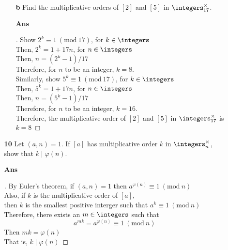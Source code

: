 \documentclass[paper=usletter, fontsize=12pt]{article}
\newcommand{\Mod}[1]{\ (\mathrm{mod}\ #1)}
\begin{document}
\begin{itemize}
\begin{itemize}
\begin{itemize}
                \item[\textbf{b}] Find the multiplicative orders of $[2]$ and
                $[5]$ in $\integers_{17}^\times$.
                \item[\textbf{Ans}]
                \begin{proof}[\unskip\nopunct]

                    Show $2^k \equiv 1 \Mod{17}$, for $k \in \integers$\\
                    Then, $2^k = 1 + 17n$, for $n \in \integers$\\
                    Then, $n = (2^k-1)/17$\\
                    Therefore, for $n$ to be an integer, $k = 8$.\\

                    Similarly, show $5^k \equiv 1 \Mod{17}$, for $k \in \integers$\\
                    Then, $5^k = 1 + 17n$, for $n \in \integers$\\
                    Then, $n = (5^k-1)/17$\\
                    Therefore, for $n$ to be an integer, $k = 16$.\\

                    Therefore, the multiplicative order of $[2]$ and $[5]$ in $\integers_{17}^\times$ is $k=8$ \qedhere

                \end{proof}
                \vspace{0.2in}

            \end{itemize}

            \item[\textbf{10}] Let $(a, n)=1$. If $[a]$ has multiplicative
            order $k$ in $\integers_n^\times$, show that $k \mid \varphi(n)$.
            \item[\textbf{Ans}]
            \begin{proof}[\unskip\nopunct]
                By Euler's theorem, if $(a, n)=1$ then $a^{\varphi(n)} \equiv 1
                \Mod{n}$\\
                Also, if $k$ is the multiplicative order of $[a]$, \\
                then $k$ is the smallest positive interger such that $a^k \equiv 1 \Mod{n}$\\
                Therefore, there exists an $m \in \integers$ such that
                \begin{equation*}
                    a^{mk} = a^{\varphi(n)} \equiv 1 \Mod{n}
                \end{equation*}
                Then $mk = \varphi(n)$\\
                That is, $k \mid \varphi(n)$ \qedhere
            \end{proof}
            \vspace{0.2in}


\end{itemize}
\end{itemize}
\end{document}
